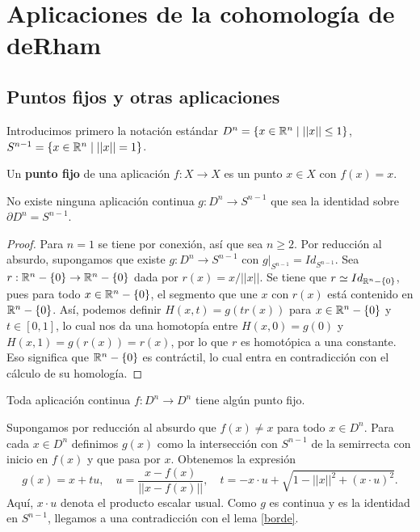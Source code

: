 \documentclass[CV.tex]{subfiles}
\begin{document}

\chapter{Aplicaciones de la cohomología de deRham}

\section{Puntos fijos y otras aplicaciones}
Introducimos primero la notación estándar $D^n=\{x\in\mathbb{R}^n\mid ||x||\leq 1\}$, $S^{n-1}=\{x\in\mathbb{R}^n\mid ||x||=1\}$.
\begin{defi}
Un \textbf{punto fijo} de una aplicación $f:X\to X$ es un punto $x\in X$ con $f(x)=x$.
\end{defi}

\begin{lemma}\label{borde}
No existe ninguna aplicación continua $g:D^n\to S^{n-1}$ que sea la identidad sobre $\partial D^n=S^{n-1}$.
\end{lemma}
\begin{proof}
Para $n=1$ se tiene por conexión, así que sea $n\geq 2$. Por reducción al absurdo, supongamos que existe $g:D^n\to S^{n-1}$ con $g|_{S^{n-1}}=Id_{S^{n-1}}$. Sea $r:\mathbb{R}^n-\{0\}\to\mathbb{R}^n-\{0\}$ dada por $r(x)=x/||x||$. Se tiene que $r\simeq Id_{\mathbb{R}^n-\{0\}}$, pues para todo $x\in\mathbb{R}^n-\{0\}$, el segmento que une $x$ con $r(x)$ está contenido en $\mathbb{R}^n-\{0\}$. Así, podemos definir $H(x,t)=g(tr(x))$ para $x\in\mathbb{R}^n-\{0\}$ y $t\in[0,1]$, lo cual nos da una homotopía entre $H(x,0)=g(0)$ y $H(x,1)=g(r(x))=r(x)$, por lo que $r$ es homotópica a una constante. Eso significa que $\mathbb{R}^n-\{0\}$ es contráctil, lo cual entra en contradicción con el cálculo de su homología.
\end{proof}

\begin{teorema} Toda aplicación continua $f:D^n\to D^n$ tiene algún punto fijo.
\end{teorema}
\begin{dem}
Supongamos por reducción al absurdo que $f(x)\neq x$ para todo $x\in D^n$. Para cada $x\in D^n$ definimos $g(x)$ como la intersección con $S^{n-1}$ de la semirrecta con inicio en $f(x)$ y que pasa por $x$. Obtenemos la expresión 
\[
g(x)=x+tu,\quad u=\frac{x-f(x)}{||x-f(x)||}, \quad t=-x\cdot u+\sqrt{1-||x||^2+(x\cdot u)^2}.
\] 
Aquí, $x\cdot u$ denota el producto escalar usual. Como $g$ es continua y es la identidad en $S^{n-1}$, llegamos a una contradicción con el lema \ref{borde}.
\QED
\end{dem}
\end{document}
